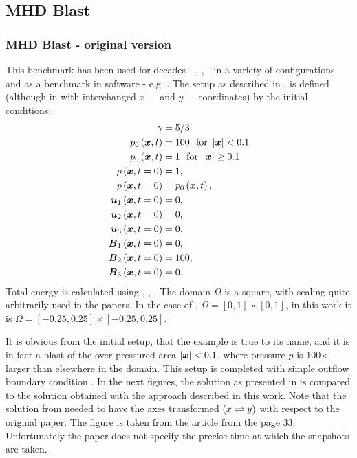 \subsection{MHD Blast}
\subsubsection{MHD Blast - original version}
This benchmark has been used for decades - \cite{blast0}, \cite{blast1}, \cite{blast2} - in a variety of configurations and as a benchmark in software - e.g. \citep{athena}. The setup as described in \cite{blast0}, \cite{blast1} is defined (although in \cite{blast1} with interchanged $x-$ and $y-$ coordinates) by the initial conditions:
\begin{align}
\label{mhdBlastOld}
\gamma & =  5 / 3\\ \nonumber
p_0\left(\mbox{\boldmath $x$}, t\right) & =  100\ \ \text{for}\ \left|\mbox{\boldmath $x$}\right| < 0.1\\ \nonumber
p_0\left(\mbox{\boldmath $x$}, t\right) & =  1\ \ \text{for}\ \left|\mbox{\boldmath $x$}\right| \geq 0.1\\ \nonumber
\rho\left(\mbox{\boldmath $x$}, t = 0\right) & =  1,\\ \nonumber
p\left(\mbox{\boldmath $x$}, t = 0\right) & =  p_0\left(\mbox{\boldmath $x$}, t\right),\\ \nonumber
\mbox{\boldmath $u$}_1\left(\mbox{\boldmath $x$}, t = 0\right) & =  0,\\ \nonumber
\mbox{\boldmath $u$}_2\left(\mbox{\boldmath $x$}, t = 0\right) & =  0,\\ \nonumber
\mbox{\boldmath $u$}_3\left(\mbox{\boldmath $x$}, t = 0\right) & =  0,\\ \nonumber
\mbox{\boldmath $B$}_1\left(\mbox{\boldmath $x$}, t = 0\right) & =  0,\\ \nonumber
\mbox{\boldmath $B$}_2\left(\mbox{\boldmath $x$}, t = 0\right) & =  100,\\ \nonumber
\mbox{\boldmath $B$}_3\left(\mbox{\boldmath $x$}, t = 0\right) & =  0.
\end{align}
Total energy is calculated using , , .
The domain $\Omega$ is a square, with scaling quite arbitrarily used in the papers. In the case of \cite{blast1}, $\Omega = [0, 1] \times [0, 1]$, in this work it is $\Omega = [-0.25, 0.25] \times [-0.25, 0.25]$.

It is obvious from the initial setup, that the example is true to its name, and it is in fact a blast of the over-pressured area $\left|\mbox{\boldmath $x$}\right| < 0.1$, where pressure $p$ is 100$\times$ larger than elsewhere in the domain. This setup is completed with simple outflow boundary condition .
In the next figures, the solution as presented in \cite{blast1} is compared to the solution obtained with the approach described in this work. Note that the solution from \cite{blast1} needed to have the axes transformed $\left( x\rightleftharpoons y\right)$ with respect to the original paper. The figure  is taken from the article \cite{blast1} from the page 33. Unfortunately the paper does not specify the precise time at which the snapshots are taken.

